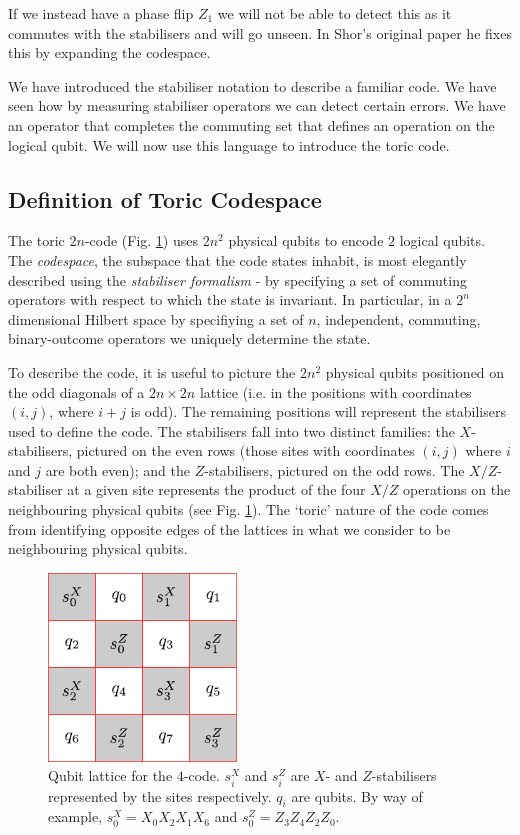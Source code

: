 If we instead have a phase flip $Z_1$ we will not be able to detect this as it commutes with the stabilisers and will go unseen. In Shor's original paper he fixes this by expanding the codespace.

We have introduced the stabiliser notation to describe a familiar code. We have seen how by measuring stabiliser operators we can detect certain errors. We have an operator that completes the commuting set that defines an operation on the logical qubit. We will now use this language to introduce the toric code.

\subsection{Definition of Toric Codespace}

The toric $2n$-code (Fig. \ref{4-code}) uses $2n^2$ physical qubits to encode $2$ logical qubits. The \textit{codespace}, the subspace  that the code states inhabit, is most elegantly described using the \textit{stabiliser formalism} - by specifying a set of commuting operators with respect to which the state is invariant. In particular, in a $2^n$ dimensional Hilbert space by specifiying a set of $n$, independent, commuting, binary-outcome operators we uniquely determine the state. 

To describe the code, it is useful to picture the $2n^2$ physical qubits positioned on the odd diagonals of a $2n \times 2n$ lattice (i.e. in the positions with coordinates $(i,j)$, where $i+j$ is odd). The remaining positions will represent the stabilisers used to define the code. The stabilisers fall into two distinct families: the $X$-stabilisers, pictured on the even rows (those sites with coordinates $(i,j)$ where $i$ and $j$ are both even); and the $Z$-stabilisers, pictured on the odd rows. The $X/Z$-stabiliser at a given site represents the product of the four $X/Z$ operations on the neighbouring physical qubits (see Fig. \ref{4-code}). The `toric' nature of the code comes from identifying opposite edges of the lattices in what we consider to be neighbouring physical qubits. 
\begin{figure}[htb]
  \begin{center}
    \includegraphics[width=5cm]{assets/4-code.pdf}
  \end{center}
  \caption{Qubit lattice for the $4$-code. $s_i^X$ and $s_i^Z$ are $X$- and $Z$-stabilisers represented by the sites respectively. $q_i$ are qubits. By way of example, $s_0^X = X_0 X_2 X_1 X_6$ and $s_0^Z = Z_3 Z_4 Z_2 Z_0$.}
  \label{4-code}
\end{figure}

